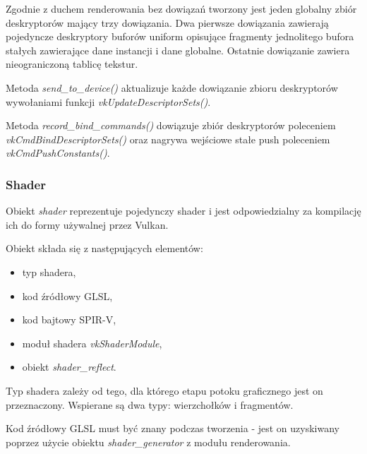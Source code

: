 Zgodnie z duchem renderowania bez dowiązań tworzony jest jeden globalny zbiór deskryptorów mający trzy dowiązania. Dwa pierwsze dowiązania zawierają pojedyncze deskryptory buforów uniform opisujące fragmenty jednolitego bufora stałych zawierające dane instancji i dane globalne. 
Ostatnie dowiązanie zawiera nieograniczoną tablicę tekstur.

Metoda \textit{send\_to\_device()} aktualizuje każde dowiązanie zbioru deskryptorów wywołaniami funkcji \textit{vkUpdateDescriptorSets()}.

Metoda \textit{record\_bind\_commands()} dowiązuje zbiór deskryptorów poleceniem \textit{vkCmdBindDescriptorSets()} oraz nagrywa wejściowe stałe push poleceniem \textit{vkCmdPushConstants()}.



\subsubsection{Shader}

Obiekt \textit{shader} reprezentuje pojedynczy shader i jest odpowiedzialny za kompilację ich do formy używalnej przez Vulkan.

Obiekt składa się z następujących elementów:
\begin{itemize}
	\item typ shadera,
	\item kod źródłowy GLSL,
	\item kod bajtowy SPIR-V,
	\item moduł shadera \textit{vkShaderModule},
	\item obiekt \textit{shader\_reflect}.
\end{itemize}

Typ shadera zależy od tego, dla którego etapu potoku graficznego jest on przeznaczony.
Wspierane są dwa typy: wierzchołków i fragmentów.

Kod źródłowy GLSL must być znany podczas tworzenia - jest on uzyskiwany poprzez użycie obiektu \textit{shader\_generator} z modułu renderowania.

